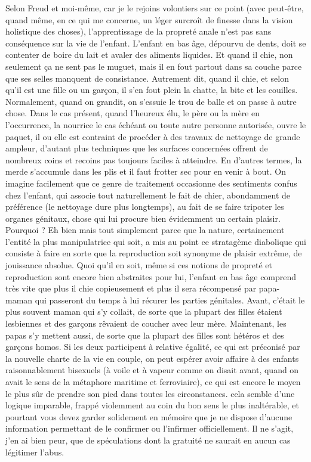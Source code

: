 Selon Freud et moi-même, car je le rejoins volontiers sur ce point (avec peut-être, quand même, en ce qui me concerne, un léger surcroît de finesse dans la vision holistique des choses), l’apprentissage de la propreté anale n’est pas sans conséquence sur la vie de l’enfant. L’enfant en bas âge, dépourvu de dents, doit se contenter de boire du lait et avaler des aliments liquides. Et quand il chie, non seulement ça ne sent pas le muguet, mais il en fout partout dans sa couche parce que ses selles manquent de consistance. Autrement dit, quand il chie, et selon qu’il est une fille ou un garçon, il s’en fout plein la chatte, la bite et les couilles. Normalement, quand on grandit, on s’essuie le trou de balle et on passe à autre chose. Dans le cas présent, quand l’heureux élu, le père ou la mère en l’occurrence, la nourrice le cas échéant ou toute autre personne autorisée, ouvre le paquet, il ou elle est contraint de procéder à des travaux de nettoyage de grande ampleur, d’autant plus techniques que les surfaces concernées offrent de nombreux coins et recoins pas toujours faciles à atteindre. En d’autres termes, la merde s’accumule dans les plis et il faut frotter sec pour en venir à bout. On imagine facilement que ce genre de traitement occasionne des sentiments confus chez l’enfant, qui associe tout naturellement le fait de chier, abondamment de préférence (le nettoyage dure plus longtemps), au fait de se faire tripoter les organes génitaux, chose qui lui procure bien évidemment un certain plaisir. Pourquoi ? Eh bien mais tout simplement parce que la nature, certainement l’entité la plus manipulatrice qui soit, a mis au point ce stratagème diabolique qui consiste à faire en sorte que la reproduction soit synonyme de plaisir extrême, de jouissance absolue. Quoi qu’il en soit, même si ces notions de propreté et reproduction sont encore bien abstraites pour lui, l’enfant en bas âge comprend très vite que plus il chie copieusement et plus il sera récompensé par papa-maman qui passeront du temps à lui récurer les parties génitales. Avant, c’était le plus souvent maman qui s’y collait, de sorte que la plupart des filles étaient lesbiennes et des garçons rêvaient de coucher avec leur mère. Maintenant, les papas s’y mettent aussi, de sorte que la plupart des filles sont hétéros et des garçons homos. Si les deux participent à relative égalité, ce qui est préconisé par la nouvelle charte de la vie en couple, on peut espérer avoir affaire à des enfants raisonnablement bisexuels (à voile et à vapeur comme on disait avant, quand on avait le sens de la métaphore maritime et ferroviaire), ce qui est encore le moyen le plus sûr de prendre son pied dans toutes les circonstances. cela semble d’une logique imparable, frappé violemment au coin du bon sens le plus inaltérable, et pourtant vous devez garder solidement en mémoire que je ne dispose d’aucune information permettant de le confirmer ou l’infirmer officiellement. Il ne s’agit, j’en ai bien peur, que de spéculations dont la gratuité ne saurait en aucun cas légitimer l’abus.


